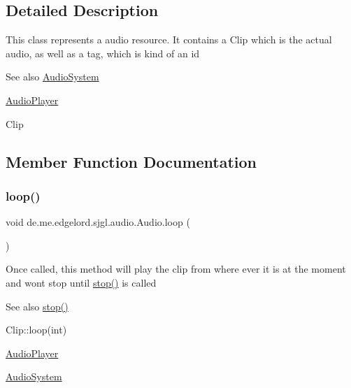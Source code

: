 \subsection{Detailed Description}
This class represents a audio resource. It contains a Clip which is the actual audio, as well as a tag, which is kind of an id

\begin{DoxySeeAlso}{See also}
\mbox{\hyperlink{classde_1_1me_1_1edgelord_1_1sjgl_1_1audio_1_1_audio_system}{Audio\+System}} 

\mbox{\hyperlink{classde_1_1me_1_1edgelord_1_1sjgl_1_1audio_1_1_audio_player}{Audio\+Player}} 

Clip 
\end{DoxySeeAlso}


\subsection{Member Function Documentation}
\mbox{\label{classde_1_1me_1_1edgelord_1_1sjgl_1_1audio_1_1_audio_a654692b8ee1f0d298af938b2c76e6a54}} 
\subsubsection{\texorpdfstring{loop()}{loop()}}
{\footnotesize\ttfamily void de.\+me.\+edgelord.\+sjgl.\+audio.\+Audio.\+loop (\begin{DoxyParamCaption}{ }\end{DoxyParamCaption})}

Once called, this method will play the clip from where ever it is at the moment and won\textquotesingle{}t stop until {\ttfamily \mbox{\hyperlink{classde_1_1me_1_1edgelord_1_1sjgl_1_1audio_1_1_audio_a2e9d9c2e43c4bab399c7f360c8f90ce2}{stop()}}} is called

\begin{DoxySeeAlso}{See also}
\mbox{\hyperlink{classde_1_1me_1_1edgelord_1_1sjgl_1_1audio_1_1_audio_a2e9d9c2e43c4bab399c7f360c8f90ce2}{stop()}} 

Clip\+::loop(int) 

\mbox{\hyperlink{classde_1_1me_1_1edgelord_1_1sjgl_1_1audio_1_1_audio_player}{Audio\+Player}} 

\mbox{\hyperlink{classde_1_1me_1_1edgelord_1_1sjgl_1_1audio_1_1_audio_system}{Audio\+System}} 
\end{DoxySeeAlso}
\mbox{\label{classde_1_1me_1_1edgelord_1_1sjgl_1_1audio_1_1_audio_ac87651401394ee2e141c099a175cd7cb}} 
